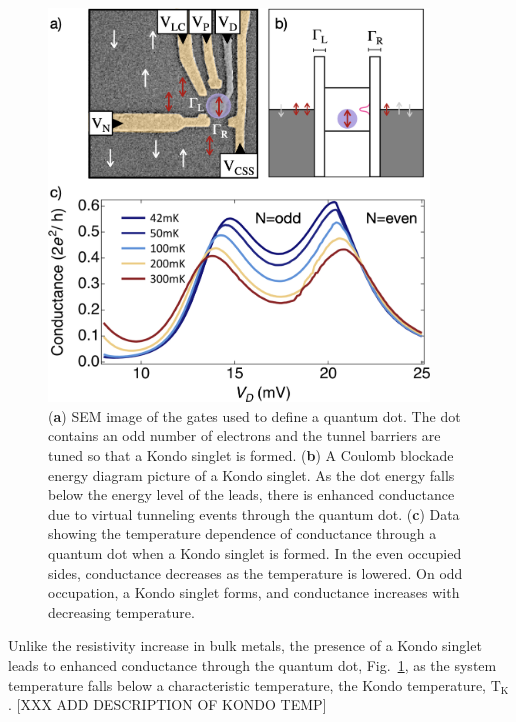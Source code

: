  \begin{figure}[!hbt]
 \begin{center}
  \includegraphics[width=0.9\textwidth]{figures/ch2/crop_FiguresMaster.011.png}
  \caption[Kondo effect in a quantum dot in the Kondo regime]{\label{fig:ch2/kondo_regime_conductance} 
  (\textbf{a}) SEM image of the gates used to define a quantum dot. The dot contains an odd number of electrons and the tunnel barriers are tuned so that a Kondo singlet is formed. (\textbf{b}) A Coulomb blockade energy diagram picture of a Kondo singlet. As the dot energy falls below the energy level of the leads, there is enhanced conductance due to virtual tunneling events through the quantum dot. (\textbf{c}) Data showing the temperature dependence of conductance through a quantum dot when a Kondo singlet is formed. In the even occupied sides, conductance decreases as the temperature is lowered. On odd occupation, a Kondo singlet forms, and conductance increases with decreasing temperature.}
 \end{center}
\end{figure}



 Unlike the resistivity increase in bulk metals, the presence of a Kondo singlet leads to enhanced conductance through the quantum dot, Fig.~\ref{fig:ch2/kondo_regime_conductance}, as the system temperature falls below a characteristic temperature, the Kondo temperature, $\mathrm{T_K}$. [XXX ADD DESCRIPTION OF KONDO TEMP]

